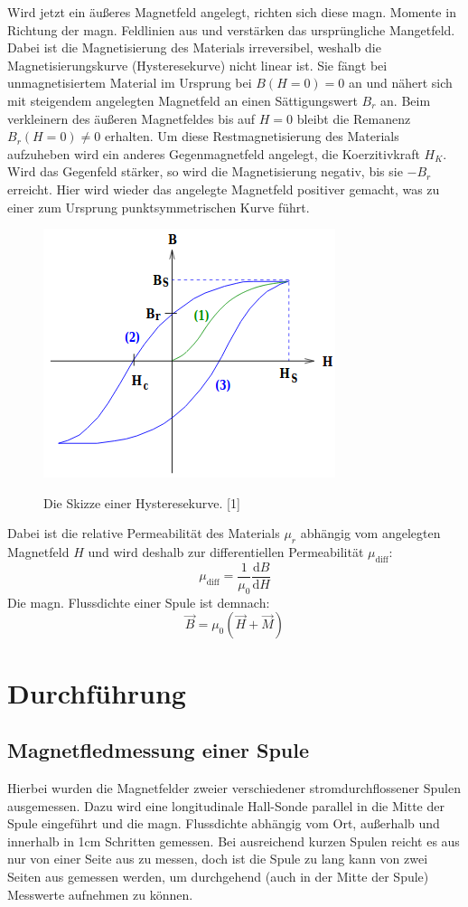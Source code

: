 \documentclass[titlepage = firstcover]{scrartcl}
\begin{document}
      Wird jetzt ein äußeres Magnetfeld angelegt, richten sich diese magn. Momente in Richtung der magn. Feldlinien aus und verstärken das ursprüngliche Mangetfeld.
      Dabei ist die Magnetisierung des Materials irreversibel, weshalb die Magnetisierungskurve (Hysteresekurve) nicht linear ist. Sie fängt bei
      unmagnetisiertem Material im Ursprung bei $B(H=0) = 0$ an und nähert sich mit steigendem angelegten Magnetfeld an einen Sättigungswert $B_r$ an.
      Beim verkleinern des äußeren Magnetfeldes bis auf $H = 0$ bleibt die Remanenz $B_r(H=0) \neq 0$ erhalten. Um diese Restmagnetisierung des Materials
      aufzuheben wird ein anderes Gegenmagnetfeld angelegt, die Koerzitivkraft $H_K$. Wird das Gegenfeld stärker, so wird die Magnetisierung negativ, bis
      sie $-B_r$ erreicht. Hier wird wieder das angelegte Magnetfeld positiver gemacht, was zu einer zum Ursprung punktsymmetrischen Kurve führt.
      \begin{figure}[h]
        \centering
        \caption{Die Skizze einer Hysteresekurve. [1]}
        \includegraphics[width = 0.4\linewidth]{Hysteresekurve.png}
        \label{fig:hysterese}
      \end{figure}
      Dabei ist die relative Permeabilität des Materials $\mu_r$ abhängig vom angelegten Magnetfeld $H$ und wird deshalb zur differentiellen Permeabilität $\mu_{\text{diff}}$:
      \begin{equation}
        \mu_{\text{diff}} = \frac{1}{\mu_\text{0}} \frac{\text{d}B}{\text{d}H}
      \end{equation}
      Die magn. Flussdichte einer Spule ist demnach:
      \begin{equation}
        \vec{B} = \mu_0 (\vec{H} + \vec{M})
      \end{equation}

    \section{Durchführung}
      \subsection{Magnetfledmessung einer Spule}
        Hierbei wurden die Magnetfelder zweier verschiedener stromdurchflossener Spulen ausgemessen. Dazu wird eine longitudinale Hall-Sonde parallel in die
        Mitte der Spule eingeführt und die magn. Flussdichte abhängig vom Ort, außerhalb und innerhalb in 1cm Schritten gemessen. Bei ausreichend kurzen Spulen reicht es aus nur von einer Seite aus
        zu messen, doch ist die Spule zu lang kann von zwei Seiten aus gemessen werden, um durchgehend (auch in der Mitte der Spule) Messwerte aufnehmen zu
        können.
\end{document}
